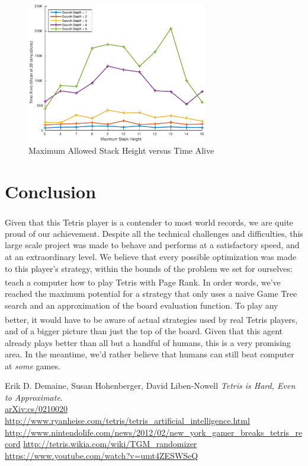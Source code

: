 \documentclass[fontsize=12pt]{article}
\def\tetris{Tetris\textsuperscript{\textregistered}}
\begin{document}
\begin{figure}[H]
  \centering
  \includegraphics[width=0.7\textwidth]{figures/height_v_time_dall}
  \caption{Maximum Allowed Stack Height versus Time Alive}
  \label{fig:stack_height_vs_time_alive_all}
\end{figure}

\section{Conclusion}
\label{sec:conclusion}

\par Given that this \tetris{} player is a contender to most world records, we are quite proud of our achievement. Despite all the technical challenges and difficulties, this large scale project was made to behave and performs at a satisfactory speed, and at an extraordinary level. We believe that every possible optimization was made to this player's strategy, within the bounds of the problem we set for ourselves: teach a computer how to play \tetris{} with Page Rank. In order words, we've reached the maximum potential for a strategy that only uses a naive Game Tree search and an approximation of the board evaluation function. To play any better, it would have to be aware of actual strategies used by real \tetris{} players, and of a bigger picture than just the top of the board. Given that this agent already plays better than all but a handful of humans, this is a very promising area. In the meantime, we'd rather believe that humans can still beat computer at \emph{some} games.


\newpage
\begin{thebibliography}{9}
Erik D. Demaine, Susan Hohenberger, David Liben-Nowell
\textit{Tetris is Hard, Even to Approximate}.
\\\href{https://arxiv.org/abs/cs/0210020}{arXiv:cs/0210020}
  \url{http://www.ryanheise.com/tetris/tetris_artificial_intelligence.html}
  \url{http://www.nintendolife.com/news/2012/02/new_york_gamer_breaks_tetris_record}
  \url{http://tetris.wikia.com/wiki/TGM_randomizer}
  \url{https://www.youtube.com/watch?v=umt4ZESWSeQ}
\end{thebibliography}
\end{document}
